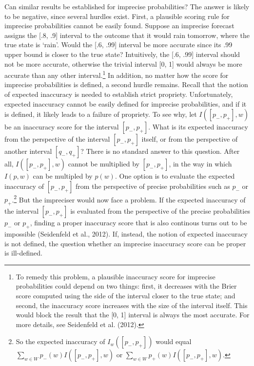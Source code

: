 \documentclass[
  letterpaper,
  DIV=11,
  numbers=noendperiod]{scrartcl}
\begin{document}
Can similar results be established for imprecise probabilities? The
answer is likely to be negative, since several hurdles exist. First, a
plausible scoring rule for imprecise probabilities cannot be easily
found. Suppose an imprecise forecast assigns the {[}.8, .9{]} interval
to the outcome that it would rain tomorrow, where the true state is
`rain'. Would the {[}.6, .99{]} interval be more accurate since its .99
upper bound is closer to the true state? Intuitively, the {[}.6, .99{]}
interval should not be more accurate, otherwise the trivial interval
{[}0, 1{]} would always be more accurate than any other
interval.\footnote{To remedy this problem, a plausible inaccuracy score
  for imprecise probabilities could depend on two things: first, it
  decreases with the Brier score computed using the side of the interval
  closer to the true state; and second, the inaccuracy score increases
  with the size of the interval itself. This would block the result that
  the {[}0, 1{]} interval is always the most accurate. For more details,
  see Seidenfeld et al. (2012).} In addition, no matter how the score
for imprecise probabilities is defined, a second hurdle remains. Recall
that the notion of expected inaccuracy is needed to establish strict
propriety. Unfortunately, expected inaccuracy cannot be easily defined
for imprecise probabilities, and if it is defined, it likely leads to a
failure of propriety. To see why, let \(I([p_-, p_+], w)\) be an
inaccuracy score for the interval \([p_-, p_+]\). What is its expected
inaccuracy from the perspective of the interval \([p_-, p_+]\) itself,
or from the perspective of another interval \([q_-, q_+]\)? There is no
standard answer to this question. After all, \(I([p_-, p_+], w)\) cannot
be multiplied by \([p_-, p_+]\), in the way in which \(I(p, w)\) can be
multipled by \(p(w)\). One option is to evaluate the expected inaccuracy
of \([p_-, p_+]\) from the perspective of precise probabilities such as
\(p_-\) or \(p_+\).\footnote{So the expected inaccuracy of
  \(I_w([p_-, p_+])\) would equal
  \(\sum_{w\in W} p_-(w)I([p_-, p_+], w)\) or
  \(\sum_{w\in W} p_+(w)I([p_-, p_+], w)\).} But the impreciser would
now face a problem. If the expected inaccuracy of the interval
\([p_-, p_+]\) is evaluated from the perspective of the precise
probabilities \(p_-\) or \(p_+\), finding a proper inaccuracy score that
is also continous turns out to be impossible (Seidenfeld et al., 2012).
If, instead, the notion of expected inaccuracy is not defined, the
question whether an imprecise inaccuracy score can be proper is
ill-defined.
\end{document}
